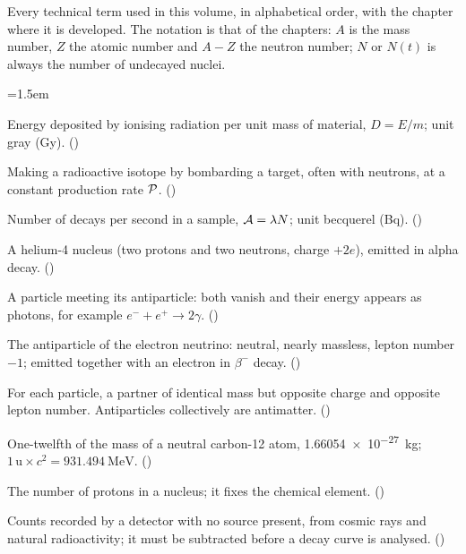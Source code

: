 
Every technical term used in this volume, in alphabetical order, with the chapter where it is developed.
The notation is that of the chapters: $A$ is the mass number, $Z$ the atomic number and $A-Z$ the
neutron number; $N$ or $N(t)$ is always the number of undecayed nuclei.

{\small\emergencystretch=1.5em
\begin{description}[leftmargin=0pt,itemsep=2pt,font=\bfseries]
\item[absorbed dose ($D$)] Energy deposited by ionising radiation per unit mass of material, $D=E/m$;
  unit gray (\si{\gray}). ()
\item[activation] Making a radioactive isotope by bombarding a target, often with neutrons, at a constant
  production rate $\mathcal{P}$. ()
\item[activity ($\Act$)] Number of decays per second in a sample, $\mathcal{A}=\lambda N$; unit becquerel
  (\si{\becquerel}). ()
\item[alpha particle ($\alpha$)] A helium-4 nucleus (two protons and two neutrons, charge $+2e$), emitted in
  alpha decay. ()
\item[annihilation] A particle meeting its antiparticle: both vanish and their energy appears as photons,
  for example $e^-+e^+\to2\gamma$. ()
\item[antineutrino ($\bar\nu_e$)] The antiparticle of the electron neutrino: neutral, nearly massless,
  lepton number $-1$; emitted together with an electron in $\beta^-$ decay. ()
\item[antiparticle, antimatter] For each particle, a partner of identical mass but opposite charge and
  opposite lepton number. Antiparticles collectively are antimatter. ()
\item[atomic mass unit (\si{\amu})] One-twelfth of the mass of a neutral carbon-12 atom,
  \SI{1.66054e-27}{kg}; $1\,\si{\amu}\times c^2=\SI{931.494}{\MeV}$. ()
\item[atomic number ($Z$)] The number of protons in a nucleus; it fixes the chemical element.
  ()
\item[background] Counts recorded by a detector with no source present, from cosmic rays and natural
  radioactivity; it must be subtracted before a decay curve is analysed. ()

\end{description}}

